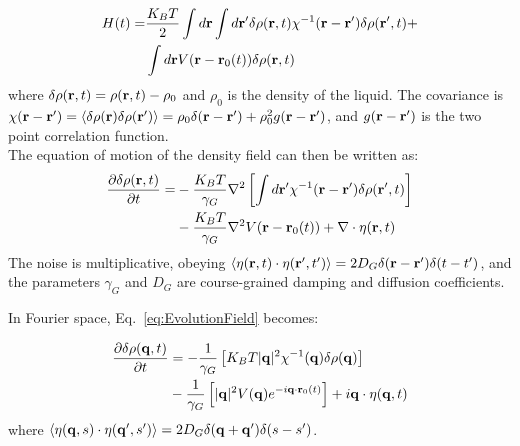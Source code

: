 \documentclass[pre,amsmath,preprintnumbers,10pt,article,notitlepage,twocolumn]{revtex4-1}
\begin{document}
\begin{equation}
\begin{split}
H(t) =& \dfrac{K_BT}{2} \int d{\bf r} \int d {\bf r}' \delta \rho ({\bf r}, t) \chi^{-1}({\bf r} - {\bf r}') \delta \rho ({\bf r}', t) + \\
&\int d{\bf r} V({\bf r} - {\bf r}_0(t))\delta \rho({\bf r}, t)
\end{split}
\end{equation}
where $\delta \rho({\bf r},t ) = \rho({\bf r}, t) - \rho_0 $ and $\rho_0$ is the density of the liquid. The covariance  is $\chi({\bf r}-{\bf r}')= \langle \delta \rho({\bf r}) \delta \rho ({\bf r}') \rangle=  \rho_0 \delta({\bf r} - {\bf r}') +\rho_0^2 g({\bf r}-{\bf r}')$, and $g({\bf r}-{\bf r}')$ is the two point correlation function. 
\\


The equation of motion of the density field can then be written as: 
\begin{equation}
\begin{split}
\frac{\partial \delta \rho({\bf r}, t)}{\partial t} =& - \dfrac{ K_BT}{\gamma_G} \nabla^2 \left[ \int  d{\bf r}' \chi^{-1} ({\bf r}-{\bf r}') \delta \rho({\bf r}', t)\right]  \\ &- \dfrac{ K_BT}{\gamma_G} \nabla^2 V({\bf r}-{\bf r}_0(t)) + \nabla \cdot \eta({\bf r},t)
\end{split}
\label{eq:EvolutionField}
\end{equation}
The noise is multiplicative, obeying $\langle \eta({\bf r}, t) \cdot \eta({\bf r}', t') \rangle = 2D_G \delta({\bf r} - {\bf r}')\delta(t-t')$, and the parameters $\gamma_G$ and $D_G$ are course-grained damping and diffusion coefficients.



In Fourier space, Eq.~\ref{eq:EvolutionField} becomes:

\begin{equation}
\begin{split}
\frac{\partial \delta \rho({\bf q},t)}{\partial t} & = -\dfrac{1}{\gamma_G}\left[ K_BT |{\bf q}|^2 \chi^{-1}({\bf q}) \delta \rho({\bf q}) \right] \\ &-\dfrac{1}{\gamma_G}\left[ |{\bf q}|^2 V({\bf q}) e^{-i {\bf q} \cdot {\bf r}_0(t)} \right] + i{\bf q} \cdot \eta({\bf q},t)
\end{split}
\label{eq:FourierEvolutionField}
\end{equation}
where $\langle \eta({\bf q}, s) \cdot \eta({\bf q}', s')  \rangle = 2D_G \delta({\bf q} + {\bf q}') \delta(s-s')$.
\end{document}

